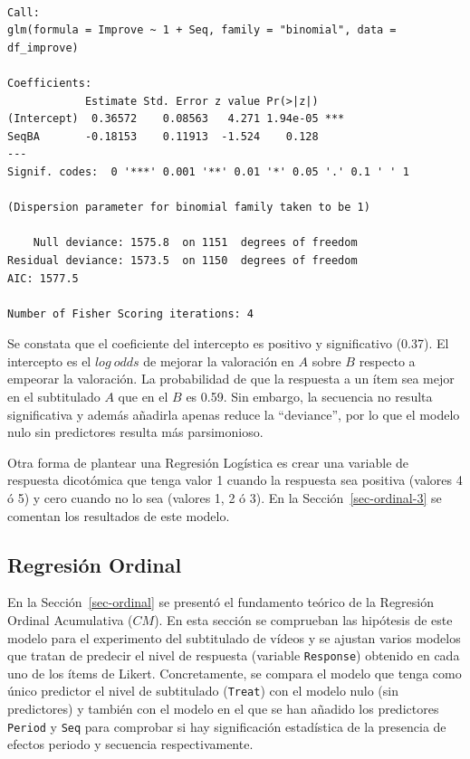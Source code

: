 \documentclass[
  12pt,
  a4paper,
  extrafontsizes,
  onecolumn,
  openright,
  table]{memoir}
\begin{document}
\begin{verbatim}

Call:
glm(formula = Improve ~ 1 + Seq, family = "binomial", data = df_improve)

Coefficients:
            Estimate Std. Error z value Pr(>|z|)    
(Intercept)  0.36572    0.08563   4.271 1.94e-05 ***
SeqBA       -0.18153    0.11913  -1.524    0.128    
---
Signif. codes:  0 '***' 0.001 '**' 0.01 '*' 0.05 '.' 0.1 ' ' 1

(Dispersion parameter for binomial family taken to be 1)

    Null deviance: 1575.8  on 1151  degrees of freedom
Residual deviance: 1573.5  on 1150  degrees of freedom
AIC: 1577.5

Number of Fisher Scoring iterations: 4
\end{verbatim}

\normalsize

Se constata que el coeficiente del intercepto es positivo y
significativo (0.37). El intercepto es el \(log\ odds\) de mejorar la
valoración en \(A\) sobre \(B\) respecto a empeorar la valoración. La
probabilidad de que la respuesta a un ítem sea mejor en el subtitulado
\(A\) que en el \(B\) es 0.59. Sin embargo, la secuencia no resulta
significativa y además añadirla apenas reduce la \enquote{deviance}, por
lo que el modelo nulo sin predictores resulta más parsimonioso.

Otra forma de plantear una Regresión Logística es crear una variable de
respuesta dicotómica que tenga valor 1 cuando la respuesta sea positiva
(valores 4 ó 5) y cero cuando no lo sea (valores 1, 2 ó 3). En la
Sección~\ref{sec-ordinal-3} se comentan los resultados de este modelo.

\hypertarget{sec-ordinal-2}{%
\subsection{Regresión Ordinal}\label{sec-ordinal-2}}

En la Sección~\ref{sec-ordinal} se presentó el fundamento teórico de la
Regresión Ordinal Acumulativa (\(CM\)). En esta sección se comprueban
las hipótesis de este modelo para el experimento del subtitulado de
vídeos y se ajustan varios modelos que tratan de predecir el nivel de
respuesta (variable \texttt{Response}) obtenido en cada uno de los ítems
de Likert. Concretamente, se compara el modelo que tenga como único
predictor el nivel de subtitulado (\texttt{Treat}) con el modelo nulo
(sin predictores) y también con el modelo en el que se han añadido los
predictores \texttt{Period} y \texttt{Seq} para comprobar si hay
significación estadística de la presencia de efectos periodo y secuencia
respectivamente.
\end{document}

